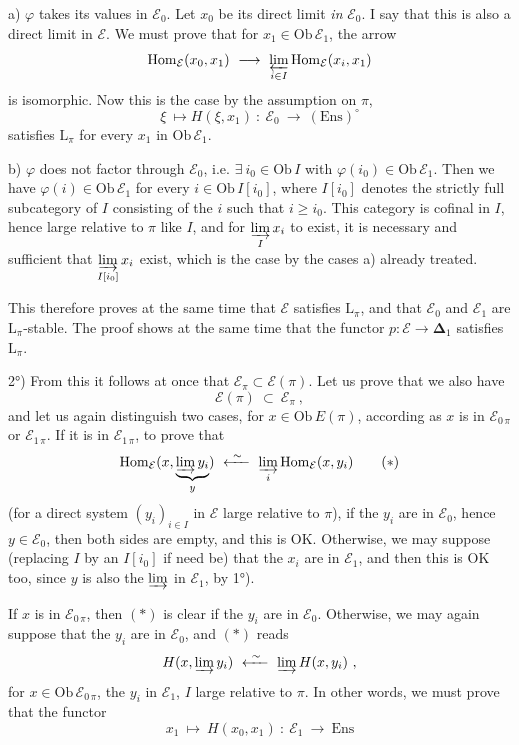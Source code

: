 \documentclass[11pt]{article}
\newcommand{\msp}[1]{\marginpar{\footnotesize [#1]}}
\newcommand{\bDelta}{\boldsymbol{\Delta}}
\newcommand{\Ens}{\mathrm{Ens}}
\newcommand{\Ob}{\mathrm{Ob}\,}
\newcommand{\Hom}{\mathrm{Hom}}
\begin{document}
a) $\varphi$ takes its values in $\mathcal{E}_0$. Let $x_0$ be its direct limit \textit{in} $\mathcal{E}_0$. I say that this is also a direct limit in $\mathcal{E}$. We must prove that for $x_1\in\Ob\mathcal{E}_1$, the arrow
\[
\Hom_{\mathcal{E}}(x_0,x_1)\ \longrightarrow\ \varprojlim_{i\in I}\Hom_{\mathcal{E}}(x_i,x_1)
\]
is isomorphic. Now this is the case
\msp{page 417}
by the assumption on $\pi$,
\[
\xi\ \longmapsto H(\xi,x_1)\ :\ \mathcal{E}_0\ \longrightarrow\ (\Ens)^{\circ}
\]
satisfies $\mathrm{L}_\pi$ for every $x_1$ in $\Ob\mathcal{E}_1$.

b) $\varphi$ does not factor through $\mathcal{E}_0$, i.e. $\exists\ i_0\in\Ob I$ with $\varphi(i_0)\in\Ob\mathcal{E}_1$. Then we have $\varphi(i)\in\Ob\mathcal{E}_1$ for every $i\in\Ob I[i_0]$, where $I[i_0]$ denotes the strictly full subcategory of $I$ consisting of the $i$ such that $i\geqslant i_0$. This category is cofinal in $I$, hence large relative to $\pi$ like $I$, and for $\varinjlim\limits_{I}x_i$ to exist, it is necessary and sufficient that $\varinjlim\limits_{I[i_0]}x_i$ exist, which is the case by the cases a) already treated. %

This therefore proves at the same time that $\mathcal{E}$ satisfies $\mathrm{L}_\pi$, and that $\mathcal{E}_0$ and $\mathcal{E}_1$ are $\mathrm{L}_\pi$-stable. The proof shows at the same time that the functor $p:\mathcal{E}\longrightarrow\bDelta_1$ satisfies $\mathrm{L}_\pi$.

2°) From this it follows at once that $\mathcal{E}_\pi\subset\mathcal{E}(\pi)$. Let us prove that we also have
\[
\mathcal{E}(\pi)\ \subset\ \mathcal{E}_\pi\ ,
\]
and let us again distinguish two cases, for
\msp{page 418}
$x\in\Ob E(\pi)$, according as $x$ is in $\mathcal{E}_{0\,\pi}$ or $\mathcal{E}_{1\,\pi}$. If it is in $\mathcal{E}_{1\,\pi}$, to prove that %
\[
\Hom_{\mathcal{E}}(x,\underbrace{\varinjlim y_i}_{y})\ \xleftarrow{\ \sim\ }\ \varinjlim_{i}\Hom_{\mathcal{E}}(x,y_i)
\tag*{$(*)$}
\]
(for a direct system $(y_i)_{i\in I}$ in $\mathcal{E}$ large relative to $\pi$), if the $y_i$ are in $\mathcal{E}_0$, hence $y\in\mathcal{E}_0$, then both sides are empty, and this is OK. Otherwise, we may suppose (replacing $I$ by an $I[i_0]$ if need be) that the $x_i$ are in $\mathcal{E}_1$, and then this is OK too, since $y$ is also the $\varinjlim$ in $\mathcal{E}_1$, by 1°). %

If $x$ is in $\mathcal{E}_{0\,\pi}$, then $(*)$ is clear if the $y_i$ are in $\mathcal{E}_0$. Otherwise, we may again suppose that the $y_i$ are in $\mathcal{E}_0$, and $(*)$ reads %
\[
H(x,\varinjlim y_i)\ \xleftarrow{\ \sim\ }\ \varinjlim H(x,y_i)\ ,
\]
for $x\in\Ob\mathcal{E}_{0\,\pi}$, the $y_i$ in $\mathcal{E}_1$, $I$ large relative to $\pi$. In other words, we must prove that the functor
\[
x_1\ \longmapsto\ H(x_0,x_1)\ :\ \mathcal{E}_1\ \longrightarrow\ \Ens
\]
\end{document}
